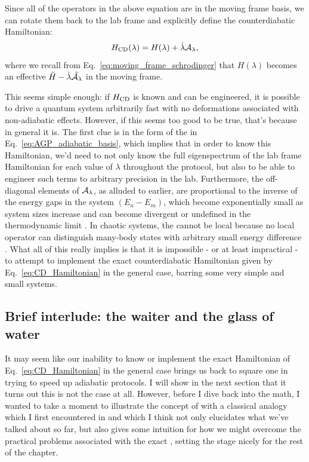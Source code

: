     Since all of the operators in the above equation are in the moving frame basis, we can rotate them back to the lab frame and explicitly define the counterdiabatic Hamiltonian:
    \begin{equation}\label{eq:CD_Hamiltonian}
    H_{\rm CD}(\lambda) = H(\lambda) + \dot{\lambda} \mathcal{A}_\lambda,
    \end{equation}
    where we recall from Eq.~\eqref{eq:moving_frame_schrodinger} that $H(\lambda)$ becomes an effective $\Tilde{H} - \dot{\lambda} \Tilde{\mathcal{A}_{\lambda}}$ in the moving frame.

    This seems simple enough: if $H_{\rm CD}$ is known and can be engineered, it is possible to drive a quantum system arbitrarily fast with no deformations associated with non-adiabatic effects. However, if this seems too good to be true, that's because in general it is. The first clue is in the form of the  in Eq.~\eqref{eq:AGP_adiabatic_basis}, which implies that in order to know this  Hamiltonian, we'd need to not only know the full eigenspectrum of the lab frame Hamiltonian for each value of $\lambda$ throughout the protocol, but also to be able to engineer such terms to arbitrary precision in the lab. Furthermore, the off-diagonal elements of $\mathcal{A}_{\lambda}$, as alluded to earlier, are proportional to the inverse of the energy gaps in the system $(E_n - E_m)$, which become exponentially small as system sizes increase and can become divergent or undefined in the thermodynamic limit \cite{kolodrubetz_geometry_2017, jarzynski_geometric_1995}. In chaotic systems, the  cannot be local because no local operator can distinguish many-body states with arbitrary small energy difference \cite{dalessio_quantum_2016}. What all of this really implies is that it is impossible - or at least impractical - to attempt to implement the exact counterdiabatic Hamiltonian given by Eq.~\eqref{eq:CD_Hamiltonian} in the general case, barring some very simple and small systems.

    \subsection{Brief interlude: the waiter and the glass of water}

    It may seem like our inability to know or implement the exact  Hamiltonian of Eq.~\eqref{eq:CD_Hamiltonian} in the general case brings us back to square one in trying to speed up adiabatic protocols. I will show in the next section that it turns out this is not the case at all. However, before I dive back into the math, I wanted to take a moment to illustrate the concept of  with a classical analogy which I first encountered in \cite{sels_minimizing_2017} and which I think not only elucidates what we've talked about so far, but also gives some intuition for how we might overcome the practical problems associated with the exact , setting the stage nicely for the rest of the chapter.
    
